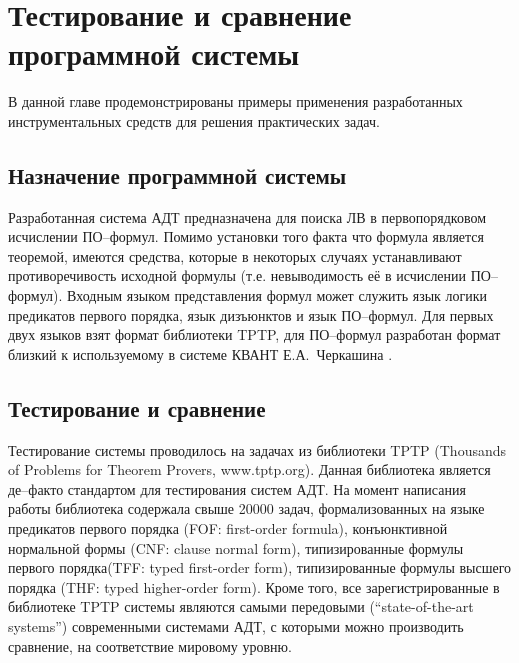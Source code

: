 \chapter{Тестирование и сравнение программной системы}
\label{part:examples}

В данной главе продемонстрированы примеры применения разработанных инструментальных средств  для решения практических задач.

\section{Назначение программной системы}
Разработанная система АДТ предназначена для поиска ЛВ в первопорядковом исчислении ПО--формул. Помимо установки того факта что формула является теоремой, имеются средства, которые в некоторых случаях устанавливают противоречивость исходной формулы (т.е. невыводимость её в исчислении ПО--формул). Входным языком представления формул может служить язык логики предикатов первого порядка, язык дизъюнктов и язык ПО--формул. Для первых двух языков взят формат библиотеки TPTP, для ПО--формул разработан формат близкий к используемому в системе КВАНТ Е.А.~Черкашина \cite{dissChe}. %




\section{Тестирование и сравнение}

Тестирование системы проводилось на задачах из библиотеки TPTP (Thousands of Problems for Theorem Provers, www.tptp.org). Данная библиотека является де--факто стандартом для тестирования систем АДТ. На момент написания работы библиотека содержала свыше 20000 задач, формализованных на языке предикатов первого порядка (FOF: first-order formula), конъюнктивной нормальной формы (CNF: clause normal form), типизированные формулы первого порядка(TFF: typed first-order form), типизированные формулы высшего порядка (THF: typed higher-order form). Кроме того, все зарегистрированные в библиотеке TPTP системы являются самыми передовыми (``state-of-the-art systems'') современными системами АДТ, с которыми можно производить сравнение, на соответствие мировому уровню.

